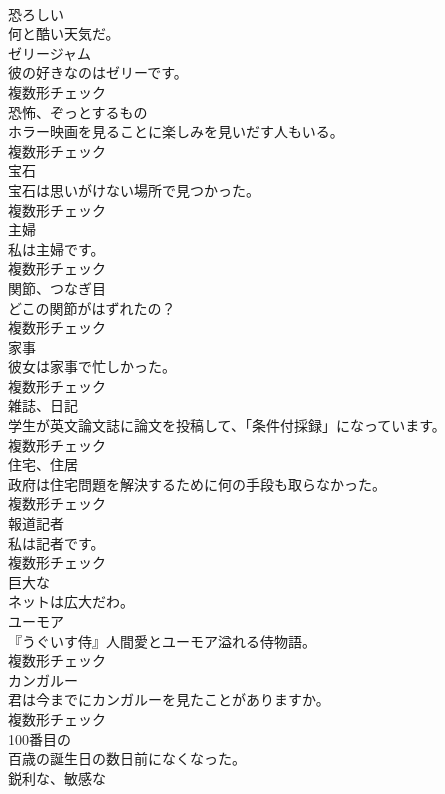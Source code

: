 \documentclass[8pt]{extreport}
\begin{document}
\begin{CJK}{UTF8}{min}
\\	[形容詞]	恐ろしい	
\\	何と酷い天気だ。	
\\	[名詞]	ゼリージャム	
\\	彼の好きなのはゼリーです。	
\\	複数形チェック
\\	[名詞]	恐怖、ぞっとするもの	
\\	ホラー映画を見ることに楽しみを見いだす人もいる。	
\\	複数形チェック
\\	[名詞]	宝石	
\\	宝石は思いがけない場所で見つかった。	
\\	複数形チェック
\\	[名詞]	主婦	
\\	私は主婦です。	
\\	複数形チェック
\\	[名詞]	関節、つなぎ目	
\\	どこの関節がはずれたの？	
\\	複数形チェック
\\	[名詞]	家事	
\\	彼女は家事で忙しかった。	
\\	複数形チェック
\\	[名詞]	雑誌、日記	
\\	学生が英文論文誌に論文を投稿して、「条件付採録」になっています。	
\\	複数形チェック
\\	[名詞]	住宅、住居	
\\	政府は住宅問題を解決するために何の手段も取らなかった。	
\\	複数形チェック
\\	[名詞]	報道記者	
\\	私は記者です。	
\\	複数形チェック
\\	[形容詞]	巨大な	
\\	ネットは広大だわ。	
\\	[名詞]	ユーモア	
\\	『うぐいす侍』人間愛とユーモア溢れる侍物語。	
\\	複数形チェック
\\	[名詞]	カンガルー	
\\	君は今までにカンガルーを見たことがありますか。	
\\	複数形チェック
\\	[形容詞]	100番目の	
\\	百歳の誕生日の数日前になくなった。	
\\	[形容詞]	鋭利な、敏感な	

\end{CJK}
\end{document}
